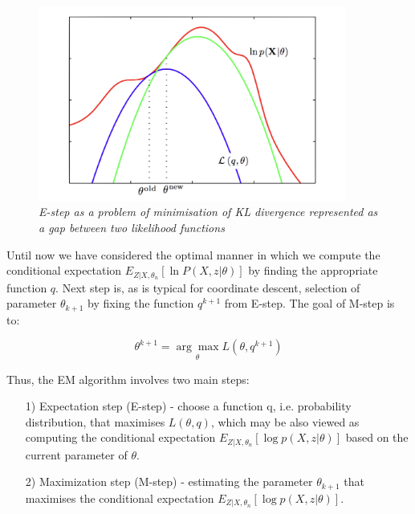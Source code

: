 \begin{figure}[h]

\begin{center}
	\includegraphics[width=0.9\textwidth]{Loglike.png}
\end{center}

\caption{\textit{E-step as a problem of minimisation of KL divergence represented as a gap between two likelihood functions}}

\end{figure}

Until now we have considered the optimal manner in which we compute the conditional expectation $E_{Z|X,\theta_n} [\ln P(X,z|\theta)]$ by finding the appropriate function $q$. Next step is, as is typical for coordinate descent, selection of parameter $\theta_{k+1}$ by fixing the function $q^{k+1}$ from E-step. The goal of M-step is to:

\begin{equation}
\theta^{k+1} = \underset{\theta}{\arg\max} L(\theta, q^{k+1})
\end{equation}

Thus, the EM algorithm involves two main steps:

\begin{itemize}
\item[1)] Expectation step (E-step) - choose a function q, i.e. probability distribution, that maximises $L(\theta, q)$, which may be also viewed as computing the conditional expectation $E_{Z|X,\theta_n} [\log p(X,z|\theta)]$ based on the current parameter of $\theta$.
\item[2)] Maximization step (M-step) - estimating the parameter $\theta_{k+1}$ that maximises the conditional expectation $E_{Z|X,\theta_n} [\log p(X,z|\theta)]$.
\end{itemize}

